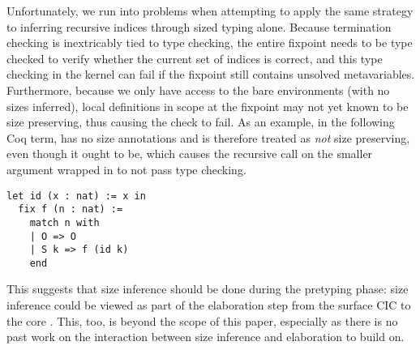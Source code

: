 Unfortunately, we run into problems when attempting to apply the same strategy to inferring recursive indices through sized typing alone.
Because termination checking is inextricably tied to type checking,
the entire fixpoint needs to be type checked to verify whether the current set of indices is correct,
and this type checking in the kernel can fail if the fixpoint still contains unsolved metavariables.
Furthermore, because we only have access to the bare environments (\ie with no sizes inferred),
local definitions in scope at the fixpoint may not yet known to be size preserving,
thus causing the check to fail.
As an example, in the following Coq term,  has no size annotations and is therefore treated as \emph{not} size preserving,
even though it ought to be, which causes the recursive call on the smaller argument wrapped in  to not pass type checking.
%
\begin{verbatim}
let id (x : nat) := x in
  fix f (n : nat) :=
    match n with
    | O => O
    | S k => f (id k)
    end
\end{verbatim}
%
This suggests that size inference should be done during the pretyping phase:
size inference could be viewed as part of the elaboration step from the surface CIC to the core \lang.
This, too, is beyond the scope of this paper, especially as there is no past work on the interaction between size inference and elaboration to build on.
